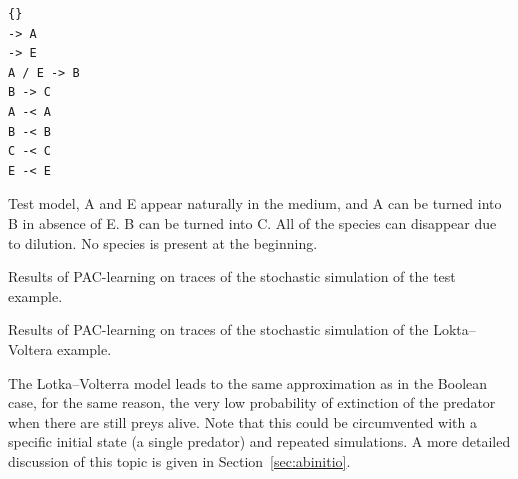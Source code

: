 \documentclass{llncs}
\newif\ifcomments
\newcommand{\sylvain}[1]{\ifcomments \textcolor{green}{#1} \fi}
\begin{document}
\begin{listfig}[htb]
   \begin{lstlisting}
{}
-> A
-> E
A / E -> B
B -> C
A -< A
B -< B
C -< C
E -< E
   \end{lstlisting}
	\caption{Test model, A and E appear naturally in the medium, and A can be turned into B in absence of E. B  can be turned into C. All of the species can disappear due to dilution. No species is present at the beginning.\label{test}}
\end{listfig}
\begin{listfig}[htb]
	
	\caption{Results of PAC-learning on traces of the stochastic simulation of the
		test example.\label{test_res}}
\end{listfig}



% 	

\begin{listfig}[htb]
	
	\caption{Results of PAC-learning on traces of the stochastic simulation of the
		Lokta--Voltera example.\label{preypred_res}}
\end{listfig}

The Lotka--Volterra model leads to the same approximation as in the
Boolean case, for the same reason, the very low probability of extinction of
the predator when there are still preys alive. Note that this could be
circumvented with a specific initial state (a single predator) and repeated
simulations. A more detailed discussion of this topic is given in
Section~\ref{sec:abinitio}.
\end{document}
